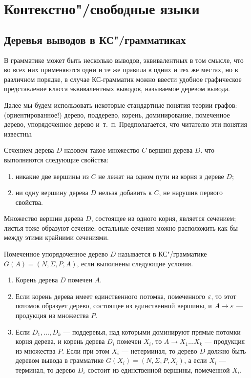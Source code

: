 \chapter{Контекстно"/свободные языки}
\label{cfg-intro}

\section{Деревья выводов в КС"/грамматиках}
\label{Chapter6-trees}

В грамматике может быть несколько выводов, эквивалентных в том смысле, что во всех них применяются одни и те же правила в одних и тех же местах, но в различном порядке, в случае КС-грамматик можно ввести удобное графическое представление класса эквивалентных выводов, называемое деревом вывода.

Далее мы будем использовать некоторые стандартные понятия теории графов: (ориентированное!) дерево, поддерево, корень, доминирование, помеченное дерево, упорядоченное дерево и~т.~п. Предполагается, что читателю эти понятия известны.

Сечением дерева $D$ назовем такое множество $C$ вершин дерева $D$. что выполняются следующие свойства: 
\begin{enumerate}
\item никакие две вершины из $C$ не лежат на одном пути из корня в дереве $D$; 
\item ни одну вершину дерева $D$ нельзя добавить к $C$, не нарушив первого свойства. 
\end{enumerate}

Множество вершин дерева $D$, состоящее из одного корня, является сечением; листья тоже образуют сечение; остальные сечения можно расположить как бы между этими крайними сечениями.

Помеченное упорядоченное дерево $D$ называется
 в КС"/грамматике $G(A)=(N,\Sigma,P,A)$,
если выполнены следующие условия.
\begin{enumerate}

\item Корень дерева $D$ помечен $A$.

\item Если корень дерева имеет единственного потомка, помеченного $\varepsilon$, то этот потомок образует дерево, состоящее из единственной вершины, и $A\to\varepsilon$ --- продукция из множества $P$.

\item Если $D_1, \ldots ,D_k$ --- поддеревья, над которыми доминируют прямые потомки корня дерева, и корень дерева $D_i$ помечен $X_i$, то $A\to X_1 \ldots X_k$ --- продукция из множества $P$. Если при этом $X_i$ --- нетерминал, то дерево $D$ должно быть деревом вывода в грамматике $G(X_i)=(N,\Sigma,P,X_i)$, а если $X_i$ --- терминал, то дерево $D_i$ состоит из единственной вершины, помеченной $X_i$.
\end{enumerate}

